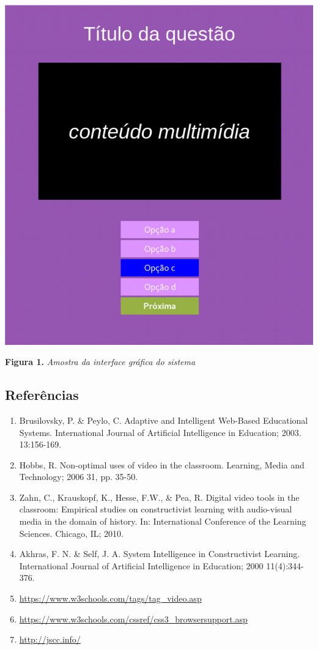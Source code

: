 \documentclass{article}
\begin{document}
\begin{center}
\includegraphics{gui.png}
\end{center}

\begin{center}
\textbf{Figura 1.} \textit{Amostra da interface gráfica do sistema}
\end{center}


\subsection{Referências}
\begin{enumerate}
\item Brusilovsky, P. \& Peylo, C. Adaptive and Intelligent Web-Based Educational
Systems. International Journal of Artificial Intelligence in Education; 2003.
13:156-169.
\item Hobbs, R. Non-optimal uses of video in the classroom. Learning, Media and
Technology; 2006 31, pp. 35-50.
\item Zahn, C., Krauskopf, K., Hesse, F.W., \& Pea, R. Digital video tools in the
classroom: Empirical studies on constructivist learning with audio-visual
media in the domain of history. In: International Conference of the Learning
Sciences. Chicago, IL; 2010.
\item Akhras, F. N. \& Self, J. A. System Intelligence in Constructivist Learning.
International Journal of Artificial Intelligence in Education; 2000 11(4):344-
376.
\item \url{https://www.w3schools.com/tags/tag_video.asp}
\item \url{https://www.w3schools.com/cssref/css3_browsersupport.asp}
\item \url{http://jscc.info/}
\end{enumerate}
\end{document}
